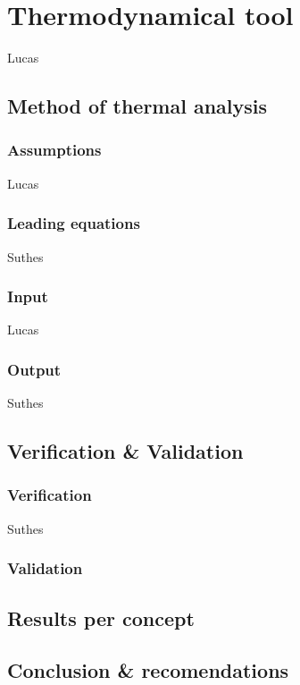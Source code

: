 \section{Thermodynamical tool}
\label{ch:thermtool}
Lucas

\subsection{Method of thermal analysis}

\subsubsection{Assumptions}
Lucas
\subsubsection{Leading equations}
Suthes
\subsubsection{Input}
Lucas
\subsubsection{Output}
Suthes


\subsection{Verification & Validation}

\subsubsection{Verification}
Suthes
\subsubsection{Validation}



\subsection{Results per concept}



\subsection{Conclusion & recomendations}

